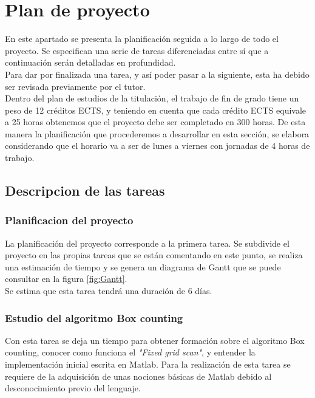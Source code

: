 \chapter{Plan de proyecto}

En este apartado se presenta la planificación seguida a lo largo de todo el proyecto. Se especifican una serie de tareas diferenciadas entre sí que a continuación serán detalladas en profundidad.\\ Para dar por finalizada una tarea, y así poder pasar a la siguiente, esta ha debido ser revisada previamente por el tutor. \\ Dentro del plan de estudios de la titulación, el trabajo de fin de grado tiene un peso de 12 créditos ECTS, y teniendo en cuenta que cada crédito ECTS equivale a 25 horas obtenemos que el proyecto debe ser completado en 300 horas. De esta manera la planificación que procederemos a desarrollar en esta sección, se elabora considerando que el horario va a ser de lunes a viernes con jornadas de 4 horas de trabajo.\\

\section{Descripcion de las tareas}
\subsection{Planificacion del proyecto}
\label{tareaPlanificacion}
La planificación del proyecto corresponde a la primera tarea. Se subdivide el proyecto en las propias tareas que se están comentando en este punto, se realiza una estimación de tiempo y se genera un diagrama de Gantt que se puede consultar en la figura \ref{fig:Gantt}.\\

Se estima que esta tarea tendrá una duración de 6 días.

\subsection{Estudio del algoritmo Box counting}
Con esta tarea se deja un tiempo para obtener formación sobre el algoritmo Box counting, conocer como funciona el \textit{"Fixed grid scan"}, y entender la implementación inicial escrita en Matlab. Para la realización de esta tarea se requiere de la adquisición de unas nociones básicas de Matlab debido al desconocimiento previo del lenguaje.\\

